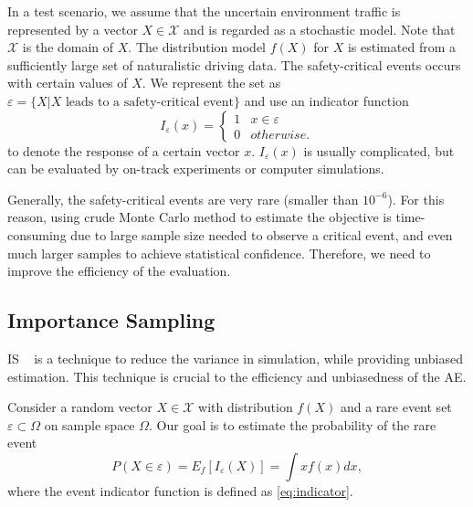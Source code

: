 \documentclass[letterpaper, 10 pt, journal]{IEEEtran}  %
\newcommand{\mansur}[1]{\textcolor{blue}{[Mansur: #1]}}
\begin{document}
In a test scenario, we assume that the uncertain environment traffic is represented by a vector $X \in \mathcal{X}$ and is regarded as a stochastic model. Note that $\mathcal{X}$ is the domain of $X$. The distribution model $f(X)$ for $X$ is estimated from a sufficiently large set of naturalistic driving data. The safety-critical events occurs with certain values of $X$. We represent the set as $\varepsilon=\{X| X \text{ leads to a safety-critical event}\}$ and use an indicator function \begin{equation} \label{eq:indicator}
	I_\varepsilon(x)=\begin{cases} 1 & x \in \varepsilon\\
0 & otherwise.\end{cases}
\end{equation} to denote the response of a certain vector $x$. $I_\varepsilon(x)$ is usually complicated, but can be evaluated by on-track experiments or computer simulations.

Generally, the safety-critical events are very rare (smaller than $10^{-6}$). For this reason, using crude Monte Carlo method to estimate the objective is time-consuming due to large sample size needed to observe a critical event, and even much larger samples to achieve statistical confidence. Therefore, we need to improve the efficiency of the evaluation.


\subsection{Importance Sampling}\label{sec:IS}
IS ~\cite{asmussen2007stochastic,ross2013simulation} is a technique to reduce the variance in simulation, while providing unbiased estimation. This technique is crucial to the efficiency and unbiasedness of the AE.

Consider a random vector $X\in \mathcal{X}$ with distribution $f(X)$ and a rare event set $\varepsilon \subset \Omega$ on sample space $\Omega$. Our goal is to estimate the probability of the rare event \begin{equation}
{P}(X \in \varepsilon)=E_f[I_\varepsilon(X)]=\int x f(x) dx,
\end{equation} where the event indicator function is defined as \eqref{eq:indicator}.
\end{document}
